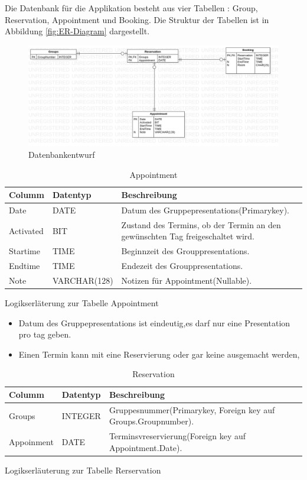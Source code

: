 \documentclass[10pt,a4paper]{article}
\begin{document}
Die Datenbank für die Applikation besteht aus vier Tabellen : Group, Reservation, Appointment und Booking.
Die Struktur der Tabellen ist in Abbildung \ref{fig:ER-Diagram} dargestellt.

\begin{figure}[ht]
	\centering
	\includegraphics[scale=0.3]{ER-Diagramm}
	\caption{Datenbankentwurf}	
	\end{figure}

\begin{table}[h]
\centering
\caption{Appointment}
    \begin{tabular}{| l | l | l | l |}
    \hline
    \rowcolor{lightgray} Columm & Datentyp & Beschreibung  \\ \hline
    Date  & DATE & Datum des Gruppepresentations(Primarykey).\\ \hline
    Activated & BIT & Zustand des Termins, ob der Termin an den gewünschten Tag freigeschaltet wird.\\ \hline
    Startime & TIME & Beginnzeit des Grouppresentations. \\ \hline
    Endtime & TIME & Endezeit des Grouppresentations.  \\ \hline
    Note & VARCHAR(128) & Notizen für Appointment(Nullable). \\ \hline
    \end{tabular}
\end{table}


Logikserläterung zur Tabelle Appointment
\begin{itemize}
\item Datum des Gruppepresentations ist eindeutig,es darf nur eine Presentation pro tag geben.
\item Einen Termin kann mit eine Reservierung oder gar keine ausgemacht werden, 
\end{itemize}

\begin{table}[h]
\centering
	\caption{Reservation}
    \begin{tabular}{| l | l | l |}
    \hline
    \rowcolor{lightgray} Columm & Datentyp & Beschreibung  \\ \hline
    Groups & INTEGER & Gruppesnummer(Primarykey, Foreign key auf Groups.Groupnumber).  \\ \hline
    Appoinment & DATE & Terminsvreservierung(Foreign key auf Appointment.Date). \\ \hline
    \end{tabular}
\end{table}
Logikserläuterung zur Tabelle Rerservation
\end{document}
